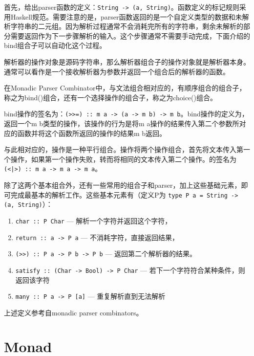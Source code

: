 首先，给出parser函数的定义：\texttt{String -> (a, String)}。函数定义的标记规则采用Haskell规范。需要注意的是，parser函数返回的是一个自定义类型的数据和未解析字符串的二元组。因为解析过程通常不会消耗完所有的字符串，剩余未解析的部分需要返回作为下一步骤解析的输入。这个步骤通常不需要手动完成，下面介绍的bind组合子可以自动化这个过程。

解析器的操作对象是源码字符串，那么解析器组合子的操作对象就是解析器本身。通常可以看作是一个接收解析器为参数并返回一个组合后的解析器的函数。

在Monadic Parser Combinator中，与文法组合相对应的，有顺序组合的组合子，称之为bind(\hsbind)组合，还有一个选择操作的组合子，称之为choice(\hschoice)组合。

bind操作的签名为：\texttt{(>>=) :: m a -> (a -> m b) -> m b}。bind操作的定义为，返回一个m b类型的操作，该操作的行为是将m a操作的结果传入第二个参数所对应的函数并将这个函数所返回的操作的结果m b返回。

与此相对应的，\hschoice{}操作是一种平行组合。\hschoice{}操作将两个操作组合，首先将文本传入第一个操作，如果第一个操作失败，转而将相同的文本传入第二个操作。\hschoice{}的签名为\texttt{(<|>) :: m a -> m a -> m a}。

除了这两个基本组合外，还有一些常用的组合子和parser，加上这些基础元素，即可完成最基本的解析工作。这些基本元素有（定义P为 \texttt{type P a = String -> (a, String)}）：

\begin{enumerate}
\item \texttt{char :: P Char} --- 解析一个字符并返回这个字符，
\item \texttt{return :: a -> P a}  --- 不消耗字符，直接返回结果，
\item \texttt{(>>) :: P a -> P b -> P b} --- 返回第二个解析器的结果。
\item \texttt{satisfy :: (Char -> Bool) -> P Char} --- 若下一个字符符合某种条件，则返回该字符
\item \texttt{many :: P a -> P [a]} --- 重复解析直到无法解析
\end{enumerate}

上述定义参考自monadic parser combinators\cite{hutton1996monadic}。

\section{Monad}

